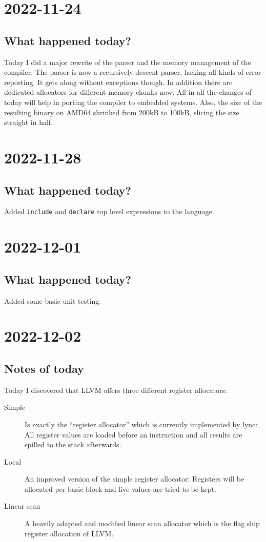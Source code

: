\documentclass[12pt, article]{article}
\begin{document}
\section{2022-11-24}

\subsection{What happened today?}

Today I did a major rewrite of the parser and the memory management of
the compiler.
The parser is now a recursively descent parser, lacking all kinds of
error reporting.
It gets along without exceptions though.
In addition there are dedicated allocators for different memory chunks
now.
All in all the changes of today will help in porting the compiler to
embedded systems.
Also, the size of the resulting binary on AMD64 shrinked from 200kB to
100kB, slicing the size straight in half.

\section{2022-11-28}

\subsection{What happened today?}

Added \texttt{include} and \texttt{declare} top level expressions to
the language.

\section{2022-12-01}

\subsection{What happened today?}

Added some basic unit testing.

\section{2022-12-02}

\subsection{Notes of today}

Today I discovered that LLVM offers three different register
allocators:
\begin{description}
\item[Simple] Is exactly the ``register allocator'' which is currently
  implemented by lync:
  All register values are loaded before an instruction and all results
  are spilled to the stack afterwards.
\item[Local] An improved version of the simple register allocator:
  Registers will be allocated per basic block and live values are
  tried to be kept.
\item[Linear scan] A heavily adapted and modified linear scan
  allocator which is the flag ship register allocation of LLVM.
\end{description}
\end{document}
